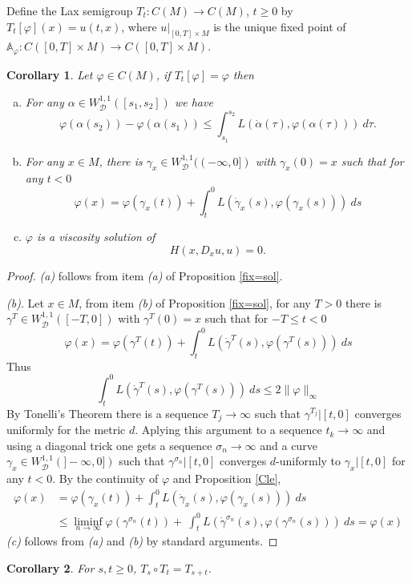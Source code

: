 \documentclass[12pt]{amsart}
\theoremstyle{plain}
\newtheorem{corollary}{Corollary}
\theoremstyle{definition}
\newcommand{\A}{\mathbb A}
\newcommand{\cD}{\mathcal D}
\newcommand{\cW}{W^{1,1}}
\newcommand{\cWD}{\cW_\cD}
\newcommand{\af}{\alpha}
\newcommand{\fui}{\varphi}
\newcommand{\ga}{\gamma}
\newcommand{\dga}{\dot\gamma}
\begin{document}
Define the Lax semigroup $T_t:C(M)\to C(M)$, $t\ge 0$ by $T_t[\fui](x)=u(t,x)$,
where $u|_{[0,T]\times M}$ is the unique fixed point of
$\A_\fui :C([0,T]\times M)\to C([0,T]\times M)$.
\begin{corollary}\label{weakKAM}
  Let $\fui\in C(M)$, if $T_t[\fui]=\fui$ then
  \begin{enumerate}[(a)]
  \item For any $\af\in\cWD([s_1,s_2])$ we have
  \[\fui(\af(s_2))-\fui(\af(s_1))\le
    \int_{s_1}^{s_2}L(\dot\af(\tau),\fui(\af(\tau)))\ d\tau.\]
\item  For any $x\in M$, there is $\ga_x\in\cWD((-\infty, 0])$ with
  $\ga_x(0)=x$ such that for any $t<0$
  \[\fui(x) =\fui(\ga_x(t))+\int_t^0L(\dga_x(s),\fui(\ga_x(s)))\ ds\]
  \item $\fui$ is a viscosity solution of
\[H(x,D_xu,u)=0.\]
  \end{enumerate}
  \end{corollary}
  \begin{proof}
    {\it (a)} follows from item {\it (a)} of Proposition \ref{fix=sol}.

    {\it (b)}. Let $x\in M$, from item {\it (b)} of Proposition \ref{fix=sol},
  for any $T>0$ there is $\ga^T\in\cWD([-T, 0])$ with
  $\ga^T(0)=x$ such that for $-T\le t<0$
  \[\fui(x) =\fui(\ga^T(t))+\int_t^0L(\dga^T(s),\fui(\ga^T(s)))\ ds\]
  Thus \[\int_t^0L(\dga^T(s),\fui(\ga^T(s)))\ ds\le 2\|\fui\|_\infty\]
By Tonelli's Theorem there is a sequence $T_j\to\infty$
such that $\ga^{T_j}|[t,0]$ converges uniformly for the metric
$d$. Aplying this argument to a sequence $t_k\to\infty$ and using a
diagonal trick one gets a sequence $\sigma_n\to\infty$ and a curve
$\ga_x\in\cWD(]-\infty,0])$ such that
$\ga^{\sigma_n}|[t,0]$ converges $d$-uniformly 
to $\ga_x|[t,0]$  for any $t<0$. By the continuity of $\fui$ and
Proposition \ref{Cle},
\begin{align*}
  \fui(x) &=\fui(\ga_x(t))+\int_t^0L(\dga_x(s),\fui(\ga_x(s)))\ ds\\
          &\le\liminf_{n\to\infty}\fui(\ga^{\sigma_n}(t))+\
            \int_t^0L(\dga^{\sigma_n}( s),\fui(\ga^{\sigma_n} (s)))\ ds=\fui(x)
\end{align*}
{\it (c)} follows from {\it (a)} and {\it (b)} by standard arguments.
\end{proof}
  \begin{corollary}  For $s,t\ge 0$, $ T_s\circ T_t=T_{s+t}$.
  \end{corollary}
\end{document}
